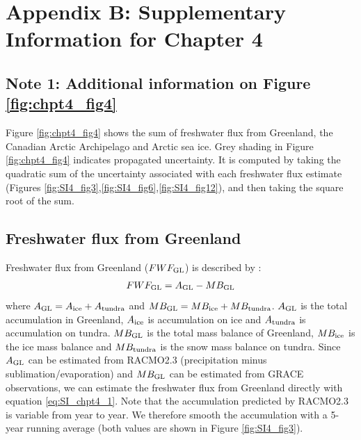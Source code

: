 \newpage
\section*{Appendix B: Supplementary Information for Chapter 4}
\subsection*{Note 1: Additional information on Figure \ref{fig:chpt4_fig4}}
Figure \ref{fig:chpt4_fig4} shows the sum of freshwater flux from Greenland, the Canadian Arctic Archipelago and Arctic sea ice. Grey shading in Figure \ref{fig:chpt4_fig4} indicates propagated uncertainty.  It is computed by taking the quadratic sum of the uncertainty associated with each freshwater flux estimate (Figures \ref{fig:SI4_fig3},\ref{fig:SI4_fig6},\ref{fig:SI4_fig12}), and then taking the square root of the sum.

\subsection*{Freshwater flux from Greenland}
Freshwater flux from Greenland ($FWF_{\textup{GL}}$) is described by \citet{bamber2012recent}:
\begin{equation} \label{eq:SI_chpt4_1}
\begin{aligned}
FWF_{\textup{GL}}=A_{\textup{GL}}-MB_{\textup{GL}}
\end{aligned}
\end{equation}
where $A_{\textup{GL}}=A_{\textup{ice}}+A_{\textup{tundra}}$ and $MB_{\textup{GL}}=MB_{\textup{ice}}+MB_{\textup{tundra}}$.
$A_{\textup{GL}}$ is the total accumulation in Greenland, $A_{\textup{ice}}$ is accumulation on ice and $A_{\textup{tundra}}$ is accumulation on tundra. $MB_{\textup{GL}}$ is the total mass balance of Greenland, $MB_{\textup{ice}}$ is the ice mass balance and $MB_{\textup{tundra}}$ is the snow mass balance on tundra.  Since $A_{\textup{GL}}$ can be estimated from RACMO2.3 (precipitation minus sublimation/evaporation) and $MB_{\textup{GL}}$ can be estimated from GRACE observations, we can estimate the freshwater flux from Greenland directly with equation \ref{eq:SI_chpt4_1}.  Note that the accumulation predicted by RACMO2.3 is variable from year to year.  We therefore smooth the accumulation with a 5-year running average (both values are shown in Figure \ref{fig:SI4_fig3}). 

